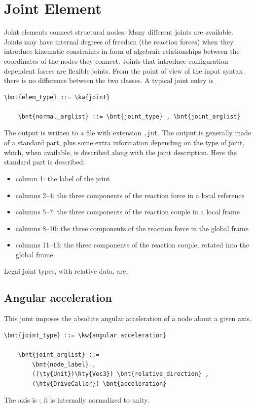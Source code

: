 \section{Joint Element}
\label{sec:EL:JOINT}
Joint elements connect structural nodes.
Many different joints are available. 
Joints may have internal degrees of freedom (the reaction forces)
when they introduce kinematic constraints in form of algebraic relationships
between the coordinates of the nodes they connect.
Joints that introduce configuration-dependent forces are flexible joints.
From the point of view of the input syntax there is no difference between
the two classes.
A typical joint entry is
\begin{Verbatim}[commandchars=\\\{\}]
    \bnt{elem_type} ::= \kw{joint}

    \bnt{normal_arglist} ::= \bnt{joint_type} , \bnt{joint_arglist}
\end{Verbatim}
The output is written to a file with extension \texttt{.jnt}.
The output is generally made of a standard part, plus some extra information
depending on the type of joint, which, when available, is described along
with the joint description.
Here the standard part is described:
\begin{itemize}
    \item column 1: the label of the joint
    \item columns 2--4: the three components of the reaction force in a local reference
    \item columns 5--7: the three components of the reaction couple in a local frame
    \item columns 8--10: the three components of the reaction force in the global frame
    \item columns 11--13: the three components of the reaction couple, rotated into the
          global frame
\end{itemize}
Legal joint types, with relative data, are:




\subsection{Angular acceleration}
This joint imposes the absolute angular acceleration of a node
about a given axis.
\begin{Verbatim}[commandchars=\\\{\}]
    \bnt{joint_type} ::= \kw{angular acceleration}

    \bnt{joint_arglist} ::=
        \bnt{node_label} ,
        ((\ty{Unit})\hty{Vec3}) \bnt{relative_direction} , 
        (\hty{DriveCaller}) \bnt{acceleration}
\end{Verbatim}
The axis is ; it is internally normalized to unity.

